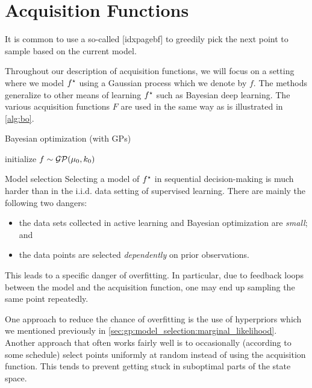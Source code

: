 \section{Acquisition Functions}

It is common to use a so-called [idxpagebf] to greedily pick the next point to sample based on the current model.

Throughout our description of acquisition functions, we will focus on a setting where we model $f^\star$ using a Gaussian process which we denote by $f$.
The methods generalize to other means of learning $f^\star$ such as Bayesian deep learning.
The various acquisition functions $F$ are used in the same way as is illustrated in \cref{alg:bo}.

\begin{algorithm}
  \caption{Bayesian optimization (with GPs)}\label{alg:bo}
  initialize $f \sim \GP{\mu_0}{k_0}$\;
\end{algorithm}

\begin{rmk}{Model selection}{}
  Selecting a model of $f^\star$ in sequential decision-making is much harder than in the i.i.d. data setting of supervised learning.
  There are mainly the following two dangers: \begin{itemize}
    \item the data sets collected in active learning and Bayesian optimization are \emph{small}; and
    \item the data points are selected \emph{dependently} on prior observations.
  \end{itemize}
  This leads to a specific danger of overfitting.
  In particular, due to feedback loops between the model and the acquisition function, one may end up sampling the same point repeatedly.

  One approach to reduce the chance of overfitting is the use of hyperpriors which we mentioned previously in \cref{sec:gp:model_selection:marginal_likelihood}.
  Another approach that often works fairly well is to occasionally (according to some schedule) select points uniformly at random instead of using the acquisition function.
  This tends to prevent getting stuck in suboptimal parts of the state space.
\end{rmk}

